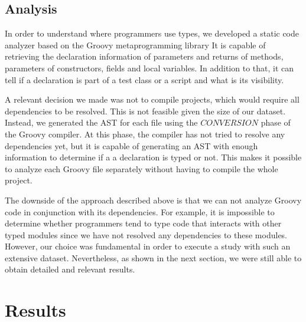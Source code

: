 \documentclass[preprint]{sigplanconf}
\begin{document}
\subsection{Analysis\label{analyzer}}
In order to understand where programmers use types, we developed a static code analyzer based on the Groovy metaprogramming library
It is capable of retrieving the declaration information of parameters and returns of methods, parameters of constructors, fields and local variables.
In addition to that, it can tell if a declaration is part of a test class or a script and what is its visibility.

A relevant decision we made was not to compile projects, which would require all dependencies to be resolved.
This is not feasible given the size of our dataset.
Instead, we generated the AST for each file using the $CONVERSION$ phase of the Groovy compiler.
At this phase, the compiler has not tried to resolve any dependencies yet, but it is capable of generating an AST with enough information to determine if a a declaration is typed or not.
This makes it possible to analyze each Groovy file separately without having to compile the whole project.

The downside of the approach described above is that we can not analyze Groovy code in conjunction with its dependencies. 
For example, it is impossible to determine whether programmers tend to type code that interacts with other typed modules since we have not resolved any dependencies to these modules.
However, our choice was fundamental in order to execute a study with such an extensive dataset.
Nevertheless, as shown in the next section, we were still able to obtain detailed and relevant results.











%
%
\section{Results\label{results}}
\end{document}

